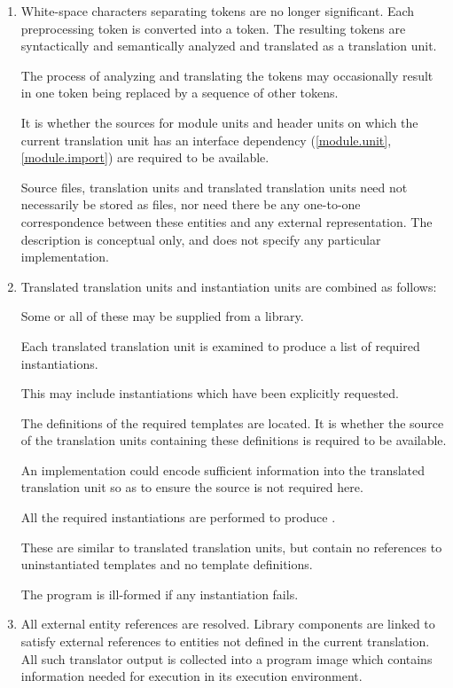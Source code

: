 \begin{enumerate}
\item White-space characters separating tokens are no longer
significant. Each preprocessing token is converted into a
token. The resulting tokens are syntactically and
semantically analyzed and translated as a translation unit. \begin{note}
The process of analyzing and translating the tokens may occasionally
result in one token being replaced by a sequence of other
tokens.\end{note}
It is
whether the sources for
module units and header units
on which the current translation unit has an interface
dependency (\ref{module.unit}, \ref{module.import})
are required to be available.
\begin{note} Source files, translation
units and translated translation units need not necessarily be stored as
files, nor need there be any one-to-one correspondence between these
entities and any external representation. The description is conceptual
only, and does not specify any particular implementation. \end{note}

\item Translated translation units and instantiation units are combined
as follows: \begin{note} Some or all of these may be supplied from a
library. \end{note} Each translated translation unit is examined to
produce a list of required instantiations. \begin{note} This may include
instantiations which have been explicitly
requested. \end{note} The definitions of the
required templates are located. It is  whether the
source of the translation units containing these definitions is required
to be available. \begin{note} An implementation could encode sufficient
information into the translated translation unit so as to ensure the
source is not required here. \end{note} All the required instantiations
are performed to produce
. \begin{note} These are similar
to translated translation units, but contain no references to
uninstantiated templates and no template definitions. \end{note} The
program is ill-formed if any instantiation fails.

\item All external entity references are resolved. Library
components are linked to satisfy external references to
entities not defined in the current translation. All such translator
output is collected into a program image which contains information
needed for execution in its execution environment.%
\end{enumerate}

